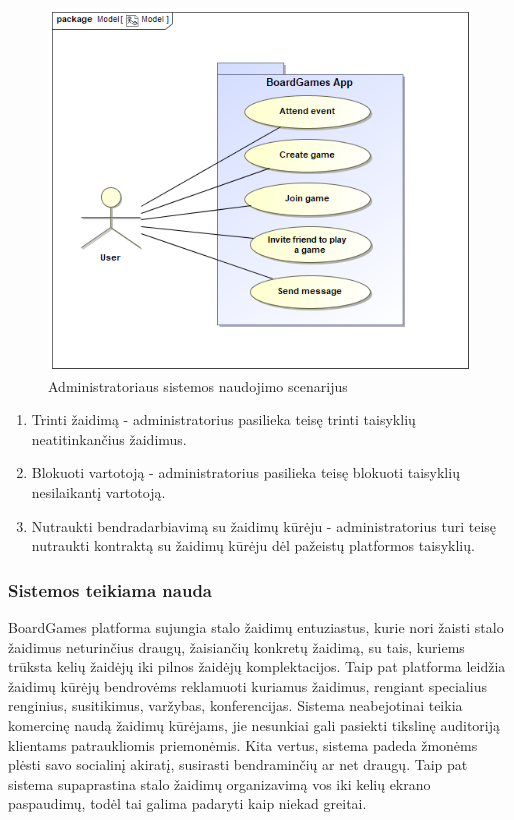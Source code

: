 \documentclass{VUMIFPSkursinis}
\begin{document}
			\begin{figure}[H]
				\centering
				\includegraphics[scale=0.5]{img/UserUseCase}
				\caption{Administratoriaus sistemos naudojimo scenarijus}
				\label{img:UserUseCase}
			\end{figure}
			
			\begin{enumerate}
				\item Trinti žaidimą - administratorius pasilieka teisę trinti 
				taisyklių neatitinkančius žaidimus.
				\item Blokuoti vartotoją - administratorius pasilieka teisę blokuoti 
				taisyklių nesilaikantį vartotoją.
				\item Nutraukti bendradarbiavimą su žaidimų kūrėju - administratorius 
				turi teisę nutraukti kontraktą su žaidimų kūrėju dėl pažeistų platformos taisyklių.			
			\end{enumerate}	
			
	\subsubsection {Sistemos teikiama nauda}
	BoardGames platforma sujungia stalo žaidimų entuziastus, kurie nori žaisti 
	stalo žaidimus neturinčius draugų, žaisiančių konkretų žaidimą, su tais, 
	kuriems trūksta kelių žaidėjų iki pilnos žaidėjų komplektacijos. Taip pat 
	platforma leidžia žaidimų kūrėjų bendrovėms reklamuoti kuriamus žaidimus, 
	rengiant specialius renginius, susitikimus, varžybas, konferencijas. Sistema 
	neabejotinai teikia komercinę naudą žaidimų kūrėjams, jie nesunkiai gali 
	pasiekti tikslinę auditoriją klientams patraukliomis priemonėmis. Kita vertus, 
	sistema padeda žmonėms plėsti savo socialinį akiratį, susirasti bendraminčių 
	ar net draugų. Taip pat sistema supaprastina stalo žaidimų organizavimą vos iki 
	kelių ekrano paspaudimų, todėl tai galima padaryti kaip niekad greitai.	
	
\end{document}
